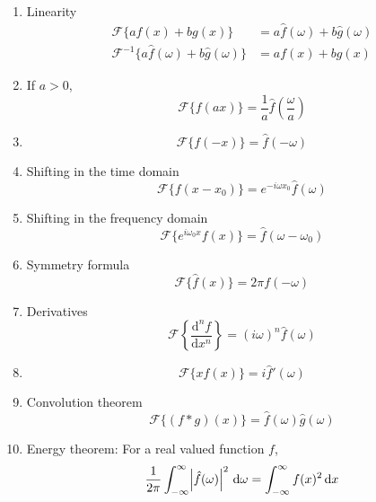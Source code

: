 \documentclass{article}
\begin{document}
\begin{enumerate}
    \item Linearity
    \begin{align*}
        \mathcal{F}\{a f(x) + b g(x)\} &= a \hat{f}(\omega) + b  \hat{g}(\omega) \\
        \mathcal{F}^{-1}\{a \hat{f}(\omega) + b  \hat{g}(\omega)\} &= a f(x) + b g(x)
    \end{align*}
    \item If $a > 0$,
    \begin{equation*}
        \mathcal{F}\{f(ax)\} = \frac{1}{a} \hat{f}\left(\frac{\omega}{a}\right)
    \end{equation*}
    \item
    \begin{equation*}
        \mathcal{F}\{f(-x)\} = \hat{f}(-\omega)
    \end{equation*}
    \item Shifting in the time domain
    \begin{equation*}
        \mathcal{F}\{f(x - x_0)\} = e^{-i \omega x_0} \hat{f}(\omega)
    \end{equation*}
    \item Shifting in the frequency domain
    \begin{equation*}
        \mathcal{F}\{e^{i \omega_0 x} f(x)\} = \hat{f}(\omega - \omega_0)
    \end{equation*}
    \item Symmetry formula
    \begin{equation*}
        \mathcal{F}\{\hat{f}(x)\} = 2 \pi f(-\omega)
    \end{equation*}
    \item Derivatives
    \begin{equation*}
        \mathcal{F}\left\{\frac{\mathrm{d}^n f}{\mathrm{d} x^n}\right\} = (i \omega)^n \hat{f}(\omega)
    \end{equation*}
    \item
    \begin{equation*}
        \mathcal{F}\{x f(x)\} = i \hat{f}'(\omega)
    \end{equation*}
    \item Convolution theorem
    \begin{equation*}
        \mathcal{F}\{(f * g)(x)\} = \hat{f}(\omega) \hat{g}(\omega)
    \end{equation*}
    \item Energy theorem: For a real valued function $f$,
    \begin{equation*}
        \frac{1}{2\pi} \int_{-\infty}^{\infty} \abs{\hat{f}(\omega)}^2 \, \mathrm{d} \omega = \int_{-\infty}^{\infty} f(x)^2 \, \mathrm{d}x
    \end{equation*}
\end{enumerate}
\end{document}
